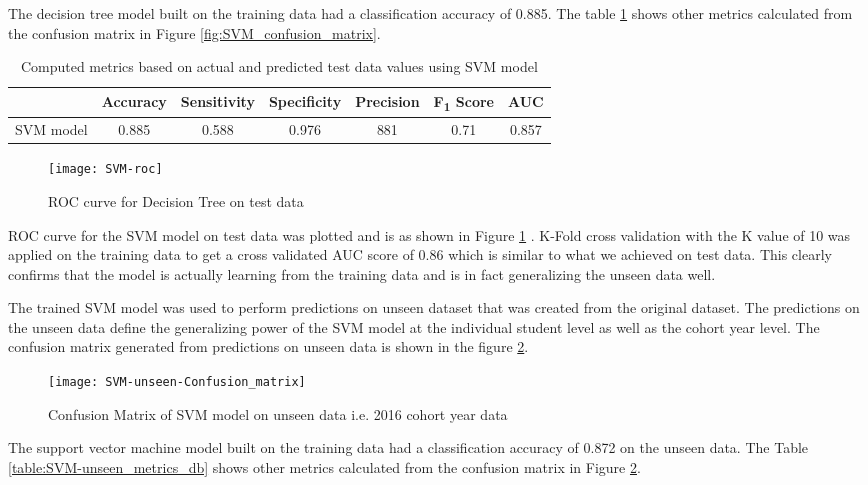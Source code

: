 \documentclass[11pt,openright]{report}
\begin{document}
The decision tree model built on the training data had a classification accuracy of 0.885. The table \ref{table:SVM_confusion_matrix} shows other metrics calculated from the confusion matrix in Figure \ref{fig:SVM_confusion_matrix}. 
\begin{table} [!htb]
	\renewcommand{\arraystretch}{1.3}
	\caption{Computed metrics based on actual and predicted test data values using SVM model}
	\label{table:SVM_confusion_matrix}
	\centering
	\begin{tabular}{|c|c|c|c|c|c|c|}
    \hline
  	 & \bfseries Accuracy & \bfseries Sensitivity & \bfseries Specificity & \bfseries Precision & \bfseries F\textsubscript{1} Score  & \bfseries AUC\\  
    \hline
	SVM model & 0.885 & 0.588 & 0.976 & 881 & 0.71 & 0.857 \\ \hline
	\end{tabular} 
\end{table}

 \begin{figure}[!htb]
	\centering
	\texttt{[image: SVM-roc]}
	\caption{ROC curve for Decision Tree on test data}
	\label{fig:SVM_roc}
\end{figure} 

ROC curve for the SVM model on test data was plotted and is as shown in Figure \ref{fig:SVM_roc} . K-Fold cross validation with the K value of 10 was applied on the training data to get a cross validated AUC score of 0.86 which is similar to what we achieved on test data. This clearly confirms that the model is actually learning from the training data and is in fact generalizing the unseen data well.

The trained SVM model was used to perform predictions on unseen dataset that was created from the original dataset. The predictions on the unseen data define the generalizing power of the SVM model at the individual student level as well as the cohort year level. The confusion matrix generated from predictions on unseen data is shown in the figure \ref{fig:SVM_unseen_confusion_matrix}.

  \begin{figure}[!htb]
	\centering
	\texttt{[image: SVM-unseen-Confusion\_matrix]}
	\caption{Confusion Matrix of SVM model on unseen data i.e. 2016 cohort year data}
	\label{fig:SVM_unseen_confusion_matrix}
\end{figure} 


The support vector machine model built on the training data had a classification accuracy of 0.872 on the unseen data. The Table \ref{table:SVM-unseen_metrics_db} shows other metrics calculated from the confusion matrix in Figure \ref{fig:SVM_unseen_confusion_matrix}.
\end{document}
